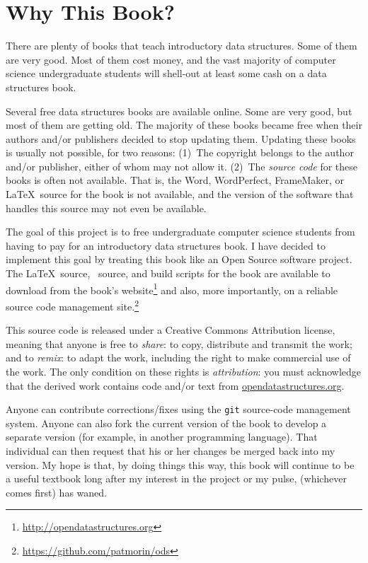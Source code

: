 \chapter*{Why This Book?}

There are plenty of books that teach introductory data structures.
Some of them are very good.  Most of them cost money, and the vast
majority of computer science undergraduate students will shell-out at
least some cash on a data structures book.

Several free data structures books are available online.  Some are very
good, but most of them are getting old.  The majority of these books
became free when their authors and/or publishers decided to stop updating
them.  Updating these books is usually not possible, for two reasons:
(1)~The copyright belongs to the author and/or publisher, either of whom
may not allow it.  (2)~The \emph{source code} for these books is often
not available.  That is, the Word, WordPerfect, FrameMaker, or \LaTeX\
source for the book is not available, and the version of the software
that handles this source may not even be available.

The goal of this project is to free undergraduate computer science
students from having to pay for an introductory data structures book.
I have decided to implement this goal by treating this book like an
Open Source
software project.  The \LaTeX\ source, \lang\ source, and
build scripts for the book are available to download from the
book's website\footnote{\url{http://opendatastructures.org}}
and also, more importantly, on a reliable source code management
site.\footnote{\url{https://github.com/patmorin/ods}}

This source code is released under a Creative Commons Attribution license,
meaning that anyone is free to \emph{share}:
to copy, distribute and
transmit the work; and to \emph{remix}:
to adapt the work, including the
right to make commercial use of the work.  The only condition on these
rights is \emph{attribution}: you must acknowledge that the derived work
contains code and/or text from \url{opendatastructures.org}.

Anyone can contribute corrections/fixes using the \texttt{git}
source-code
management system.  Anyone can also fork the current version of the
book to develop a separate version (for example, in another programming
language).  That individual can then request that his or her changes be
merged back into my version.  My hope is that, by doing things this way,
this book will continue to be a useful textbook long after my interest
in the project or my pulse, (whichever comes first) has waned.


